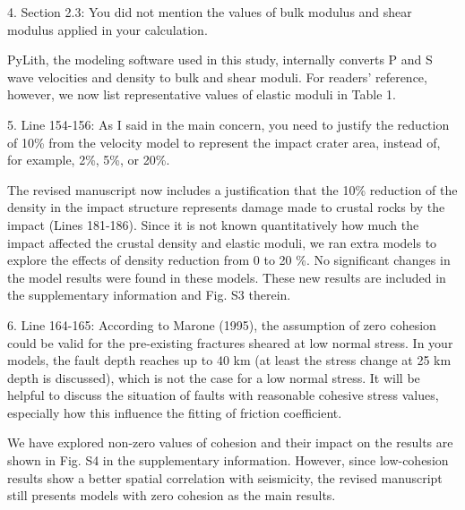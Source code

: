 \documentclass[12pt]{article}
\begin{document}
\begin{response}{4. Section 2.3: You did not mention the values of bulk modulus and shear modulus applied in your calculation.}

  PyLith, the modeling software used in this study, internally converts P and S wave velocities and density to bulk and shear moduli. For readers' reference, however, we now list representative values of elastic moduli in Table 1. 
\end{response}

\begin{response}{5. Line 154-156: As I said in the main concern, you need to justify the reduction of 10\% from the velocity model to represent the impact crater area, instead of, for example, 2\%, 5\%, or 20\%.}

  The revised manuscript now includes a justification that the 10\% reduction of the density in the impact structure represents damage made to crustal rocks by the impact (Lines 181-186). Since it is not known quantitatively how much the impact affected the crustal density and elastic moduli, we ran extra models to explore the effects of density reduction from 0 to 20 \%. No significant changes in the model results were found in these models. These new results are included in the supplementary information and Fig. S3 therein.
\end{response}

\begin{response}{6. Line 164-165: According to Marone (1995), the assumption of zero cohesion could be valid for the pre-existing fractures sheared at low normal stress. In your models, the fault depth reaches up to 40 km (at least the stress change at 25 km depth is discussed), which is not the case for a low normal stress. It will be helpful to discuss the situation of faults with reasonable cohesive stress values, especially how this influence the fitting of friction coefficient.}

    
    We have explored non-zero values of cohesion and their impact on the results are shown in Fig. S4 in the supplementary information. However, since low-cohesion results show a better spatial correlation with seismicity, the revised manuscript still presents models with zero cohesion as the main results.
    
\end{response}
\end{document}
